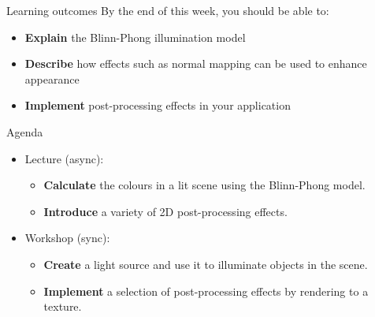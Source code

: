\begin{frame}{Learning outcomes}
	By the end of this week, you should be able to:
	\begin{itemize}
		\item \textbf{Explain} the Blinn-Phong illumination model
		\item \textbf{Describe} how effects such as normal mapping can be used to enhance appearance
		\item \textbf{Implement} post-processing effects in your application
	\end{itemize}
\end{frame}

\begin{frame}{Agenda}
	\begin{itemize}
		\pause\item Lecture (async):
		\begin{itemize}
			\item \textbf{Calculate} the colours in a lit scene using the Blinn-Phong model.
			\item \textbf{Introduce} a variety of 2D post-processing effects.
		\end{itemize}
		\pause\item Workshop (sync):
		\begin{itemize}
			\item \textbf{Create} a light source and use it to illuminate objects in the scene.
			\item \textbf{Implement} a selection of post-processing effects by rendering to a texture.
		\end{itemize}
	\end{itemize}
\end{frame}